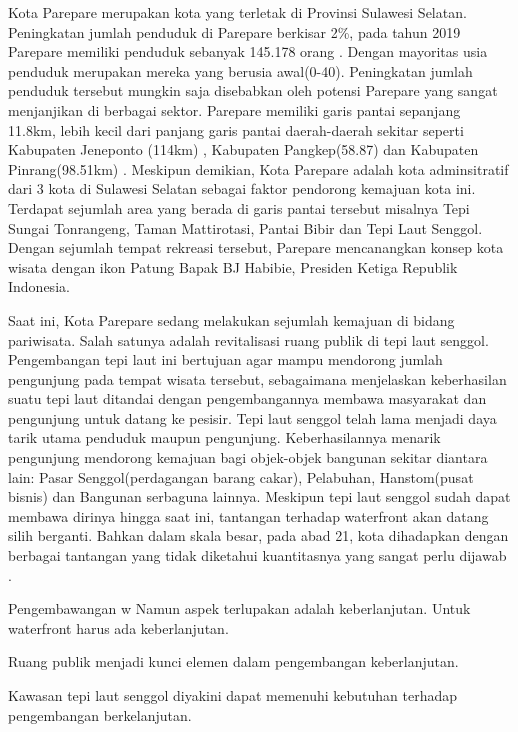 \documentclass[../projects/thesis.tex]{subfiles}
\begin{document}
Kota Parepare merupakan kota yang terletak di Provinsi Sulawesi Selatan. Peningkatan jumlah penduduk di Parepare berkisar 2\%, pada tahun 2019 Parepare memiliki penduduk sebanyak 145.178 orang \citep{bpskotaparepare2020}. Dengan mayoritas usia penduduk  merupakan mereka yang berusia awal(0-40). Peningkatan jumlah penduduk tersebut mungkin saja disebabkan oleh potensi Parepare yang sangat menjanjikan di berbagai sektor.
Parepare memiliki garis pantai sepanjang 11.8km, lebih kecil dari panjang garis pantai daerah-daerah sekitar seperti Kabupaten Jeneponto (114km) \citep{wardasusaniati2011}, Kabupaten Pangkep(58.87) dan Kabupaten Pinrang(98.51km) \citep{goni2018}. Meskipun demikian, Kota Parepare adalah kota adminsitratif dari 3 kota di Sulawesi Selatan \citep{junaid2016} sebagai faktor pendorong kemajuan kota ini.
Terdapat sejumlah area yang berada di garis pantai tersebut misalnya Tepi Sungai Tonrangeng, Taman Mattirotasi, Pantai Bibir dan Tepi Laut Senggol.
Dengan sejumlah tempat rekreasi tersebut, Parepare mencanangkan konsep kota wisata dengan ikon Patung Bapak BJ Habibie, Presiden Ketiga Republik Indonesia.

Saat ini, Kota Parepare sedang melakukan sejumlah kemajuan di bidang pariwisata. Salah satunya adalah revitalisasi ruang publik di tepi laut senggol.
Pengembangan tepi laut ini bertujuan agar mampu mendorong jumlah pengunjung pada tempat wisata tersebut, sebagaimana \cite{hoyle2001} menjelaskan keberhasilan suatu tepi laut ditandai dengan pengembangannya membawa masyarakat dan pengunjung untuk datang ke pesisir.
Tepi laut senggol telah lama menjadi daya tarik utama penduduk maupun pengunjung. Keberhasilannya menarik pengunjung mendorong kemajuan bagi objek-objek bangunan sekitar diantara lain: Pasar Senggol(perdagangan barang cakar), Pelabuhan, Hanstom(pusat bisnis) dan Bangunan serbaguna lainnya.
Meskipun tepi laut senggol sudah dapat membawa dirinya hingga saat ini, tantangan terhadap waterfront akan datang silih berganti. Bahkan dalam skala besar, pada abad 21, kota dihadapkan dengan berbagai tantangan yang tidak diketahui kuantitasnya yang sangat perlu dijawab \citep{niemann2016}.


Pengembawangan w
Namun aspek terlupakan adalah keberlanjutan.
Untuk waterfront harus ada keberlanjutan.

Ruang publik menjadi kunci elemen dalam pengembangan keberlanjutan.

Kawasan tepi laut senggol diyakini dapat memenuhi kebutuhan terhadap pengembangan berkelanjutan.
\end{document}
